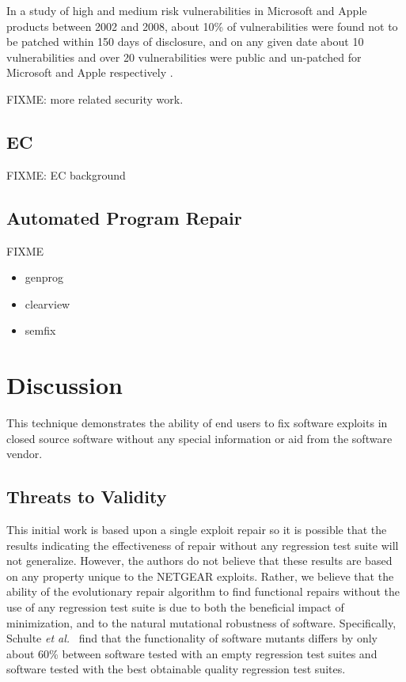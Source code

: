 \documentclass{sigcomm-alternate}
\begin{document}
In a study of high and medium risk vulnerabilities in Microsoft and
Apple products between 2002 and 2008, about 10\% of
vulnerabilities were found not to be patched within 150 days of
disclosure, and on any given date about 10 vulnerabilities and over 20
vulnerabilities were public and un-patched for Microsoft and Apple
respectively \cite{frei20080}.

FIXME: more related security work.

\subsection{EC}
\label{sec-5-2}

FIXME: EC background

\subsection{Automated Program Repair}
\label{sec-5-3}

FIXME

\begin{itemize}
\item genprog
\item clearview
\item semfix
\end{itemize}

\section{Discussion}
\label{sec-6}
This technique demonstrates the ability of end users to fix software
exploits in closed source software without any special information or
aid from the software vendor.

\subsection{Threats to Validity}
\label{sec-6-1}
This initial work is based upon a single exploit repair so it is
possible that the results indicating the effectiveness of repair
without any regression test suite will not generalize.  However, the
authors do not believe that these results are based on any property
unique to the NETGEAR exploits. Rather, we believe that the ability of
the evolutionary repair algorithm to find functional repairs without
the use of any regression test suite is due to both the beneficial
impact of minimization, and to the natural mutational robustness of
software. Specifically, Schulte \emph{et al.}~\cite{schulte2013software} 
find that the functionality of software mutants differs by only about 60\%
between software tested with an empty regression test suites and software
tested with the best obtainable quality regression test suites.
\end{document}
